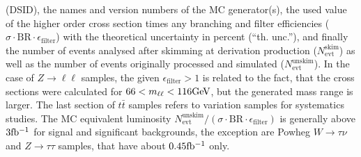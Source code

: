\begin{table}[htbp]
\begin{center}
{    			(DSID), the names and version numbers of the MC generator(s),
    			the used value of the higher order cross section times
    			any branching and filter efficiencies ($\sigma{\cdot}
    			\text{BR}{\cdot}\epsilon_\mathrm{filter}$) with the
    			theoretical uncertainty in percent (``th. unc.''),
    			and finally the number of events analysed
    			after skimming at derivation production
    			($N^\mathrm{skim}_\mathrm{evt}$) as well as the number of events
    			originally processed and simulated
    			($N^\mathrm{unskim}_\mathrm{evt}$). In the case of
    			$Z\to\ell\ell$ samples, the given $\epsilon_\mathrm{filter} > 1$
    			is related to the fact, that the cross sections were calculated
    			for $66 <m_{\ell\ell} <116\text{Ge\kern -0.1em V}$, but the generated mass range is
    			larger. The last section of $t\bar{t}$ samples refers to
    			variation samples for systematics studies. The MC equivalent
    			luminosity
    			$N^\mathrm{unskim}_\mathrm{evt}/(\sigma{\cdot}\text{BR}{\cdot}\epsilon_\mathrm{filter})$
    			is generally above $3\mbox{fb\(^{-1}\)}$ for signal and significant
    			backgrounds, the exception are Powheg $W\to\tau\nu$ and
    			$Z\to\tau\tau$ samples, that have about $0.45\mbox{fb\(^{-1}\)}$ only.}
    		\label{tab:samples13}
    	\end{center}
    \end{table}
    
